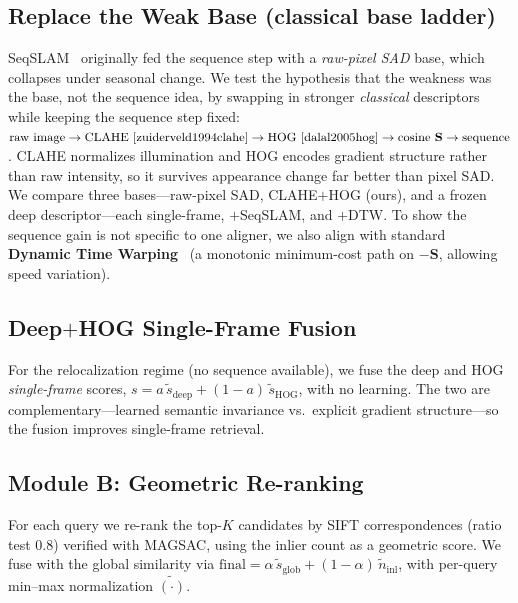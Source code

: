 \documentclass[10pt,twocolumn,letterpaper]{article}
\begin{document}
\subsection{Replace the Weak Base (classical base ladder)}
\label{sec:ladder}
SeqSLAM~\cite{milford2012seqslam} originally fed the sequence step with a
\emph{raw-pixel SAD} base, which collapses under seasonal change. We test the
hypothesis that the weakness was the base, not the sequence idea, by swapping in
stronger \emph{classical} descriptors while keeping the sequence step fixed:
$\text{raw image}\to\text{CLAHE}~\cite{zuiderveld1994clahe}\to
\text{HOG}~\cite{dalal2005hog}\to\text{cosine }\mathbf{S}\to\text{sequence}$.
CLAHE normalizes illumination and HOG encodes gradient structure rather than raw
intensity, so it survives appearance change far better than pixel SAD. We
compare three bases---raw-pixel SAD, CLAHE${+}$HOG (ours), and a frozen deep
descriptor---each single-frame, ${+}$SeqSLAM, and ${+}$DTW. To show the sequence
gain is not specific to one aligner, we also align with standard
\textbf{Dynamic Time Warping}~\cite{sakoe1978dtw} (a monotonic minimum-cost path
on $-\mathbf{S}$, allowing speed variation).

\subsection{Deep${+}$HOG Single-Frame Fusion}
\label{sec:fusion}
For the relocalization regime (no sequence available), we fuse the deep and HOG
\emph{single-frame} scores, $s=a\,\tilde{s}_{\text{deep}}+(1{-}a)\,\tilde{s}_{\text{HOG}}$,
with no learning. The two are complementary---learned semantic invariance vs.\
explicit gradient structure---so the fusion improves single-frame retrieval.

\subsection{Module B: Geometric Re-ranking}
For each query we re-rank the top-$K$ candidates by SIFT correspondences
(ratio test $0.8$) verified with MAGSAC, using the inlier count as a geometric
score. We fuse with the global similarity via
$\text{final}=\alpha\,\widetilde{s}_{\text{glob}}+(1-\alpha)\,\widetilde{n}_{\text{inl}}$,
with per-query min--max normalization $\widetilde{(\cdot)}$.
\end{document}
